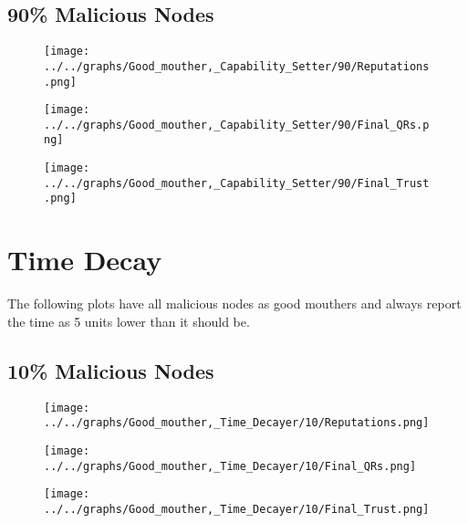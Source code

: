 \begin{minipage}[t]{0.49\columnwidth}
\subsection*{90\% Malicious Nodes}
    \begin{figure}[H]
        \centering
        \texttt{[image: ../../graphs/Good\_mouther,\_Capability\_Setter/90/Reputations.png]}
    \end{figure}
    \begin{figure}[H]
        \centering
        \texttt{[image: ../../graphs/Good\_mouther,\_Capability\_Setter/90/Final\_QRs.png]}
    \end{figure}
\end{minipage}
\begin{minipage}[t]{0.49\columnwidth}
    \begin{figure}[H]
        \centering
        \texttt{[image: ../../graphs/Good\_mouther,\_Capability\_Setter/90/Final\_Trust.png]}
    \end{figure}
\end{minipage}
\newpage

\section*{Time Decay}
The following plots have all malicious nodes as good mouthers and always
report the time as 5 units lower than it should be.
\\
\begin{minipage}[t]{0.49\columnwidth}
\subsection*{10\% Malicious Nodes}
    \begin{figure}[H]
        \centering
        \texttt{[image: ../../graphs/Good\_mouther,\_Time\_Decayer/10/Reputations.png]}
    \end{figure}
    \begin{figure}[H]
        \centering
        \texttt{[image: ../../graphs/Good\_mouther,\_Time\_Decayer/10/Final\_QRs.png]}
    \end{figure}
\end{minipage}
\begin{minipage}[t]{0.49\columnwidth}
    \begin{figure}[H]
        \centering
        \texttt{[image: ../../graphs/Good\_mouther,\_Time\_Decayer/10/Final\_Trust.png]}
    \end{figure}
\end{minipage}

